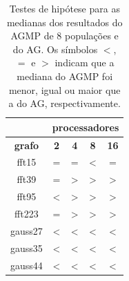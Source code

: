 \documentclass[fleqn,10pt]{SelfArx} %
\begin{document}
\begin{table}[]
\centering
\caption{Testes de hipótese para as medianas dos resultados do AGMP de 8 populações e do AG. Os símbolos $<$, $=$ e $>$ indicam que a mediana do AGMP foi menor, igual ou maior que a do AG, respectivamente.}
\label{tab:hyp-test}
\begin{tabular}{c|c|c|c|c|}
\cline{2-5}
                                     & \multicolumn{4}{c|}{\textbf{processadores}}                                                                                                                       \\ \hline
\multicolumn{1}{|c|}{\textbf{grafo}} & \textbf{2}                             & \textbf{4}                             & \textbf{8}                             & \textbf{16}                            \\ \hline
\multicolumn{1}{|c|}{fft15}          & =                                      & =                                      & \cellcolor[HTML]{B7E1CD}\textless{}    & =                                      \\ \hline
\multicolumn{1}{|c|}{fft39}          & =                                      & \cellcolor[HTML]{F4C7C3}\textgreater{} & \cellcolor[HTML]{F4C7C3}\textgreater{} & \cellcolor[HTML]{F4C7C3}\textgreater{} \\ \hline
\multicolumn{1}{|c|}{fft95}          & \cellcolor[HTML]{B7E1CD}\textless{}    & \cellcolor[HTML]{F4C7C3}\textgreater{} & \cellcolor[HTML]{F4C7C3}\textgreater{} & \cellcolor[HTML]{F4C7C3}\textgreater{} \\ \hline
\multicolumn{1}{|c|}{fft223}         & =                                      & \cellcolor[HTML]{F4C7C3}\textgreater{} & \cellcolor[HTML]{F4C7C3}\textgreater{} & \cellcolor[HTML]{F4C7C3}\textgreater{} \\ \hline
\multicolumn{1}{|c|}{gauss27}        & \cellcolor[HTML]{B7E1CD}\textless{}    & \cellcolor[HTML]{B7E1CD}\textless{}    & \cellcolor[HTML]{B7E1CD}\textless{}    & \cellcolor[HTML]{B7E1CD}\textless{}    \\ \hline
\multicolumn{1}{|c|}{gauss35}        & \cellcolor[HTML]{B7E1CD}\textless{}    & \cellcolor[HTML]{B7E1CD}\textless{}    & \cellcolor[HTML]{B7E1CD}\textless{}    & \cellcolor[HTML]{B7E1CD}\textless{}    \\ \hline
\multicolumn{1}{|c|}{gauss44}        & \cellcolor[HTML]{B7E1CD}\textless{}    & \cellcolor[HTML]{B7E1CD}\textless{}    & \cellcolor[HTML]{B7E1CD}\textless{}    & \cellcolor[HTML]{B7E1CD}\textless{}    \\ \hline

\end{tabular}
\end{table}
\end{document}

